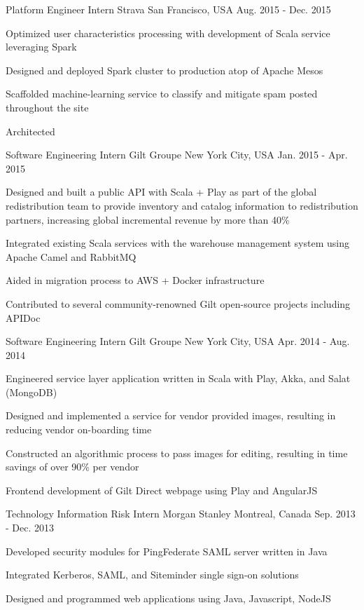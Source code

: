 \begin{cventries}
  \cventry
    {Platform Engineer Intern}
    {Strava}
    {San Francisco, USA}
    {Aug. 2015 - Dec. 2015}
    {
      \begin{cvitems}
        \item {Optimized user characteristics processing with development of Scala service leveraging Spark}
        \item {Designed and deployed Spark cluster to production atop of Apache Mesos}
        \item {Scaffolded machine-learning service to classify and mitigate spam posted throughout the site }
        \item {Architected }        
      \end{cvitems}
    }
  \cventry
    {Software Engineering Intern}
    {Gilt Groupe}
    {New York City, USA}
    {Jan. 2015 - Apr. 2015}
    {
      \begin{cvitems}
        \item {Designed and built a public API with Scala + Play as part of the global redistribution team to provide inventory and catalog information to redistribution partners, increasing global incremental revenue by more than 40\%}
        \item {Integrated existing Scala services with the warehouse management system using Apache Camel and RabbitMQ}
        \item {Aided in migration process to AWS + Docker infrastructure}
        \item {Contributed to several community-renowned Gilt open-source projects including APIDoc}
      \end{cvitems}
    }
  \cventry
    {Software Engineering Intern}
    {Gilt Groupe}
    {New York City, USA}
    {Apr. 2014 - Aug. 2014}
    {
      \begin{cvitems}
        \item {Engineered service layer application written in Scala with Play, Akka, and Salat (MongoDB)}
        \item {Designed and implemented a service for vendor provided images, resulting in reducing vendor on-boarding time}
        \item {Constructed an algorithmic process to pass images for editing, resulting in time savings of over 90\% per vendor}
        \item {Frontend development of Gilt Direct webpage using Play and AngularJS}      
      \end{cvitems} 
    }
  \cventry
    {Technology Information Risk Intern}
    {Morgan Stanley}
    {Montreal, Canada}
    {Sep. 2013 - Dec. 2013}
    {
      \begin{cvitems}
        \item {Developed security modules for PingFederate SAML server written in Java}
        \item {Integrated Kerberos, SAML, and Siteminder single sign-on solutions}
        \item {Designed and programmed web applications using Java, Javascript, NodeJS}
      \end{cvitems}
    }
\end{cventries}
